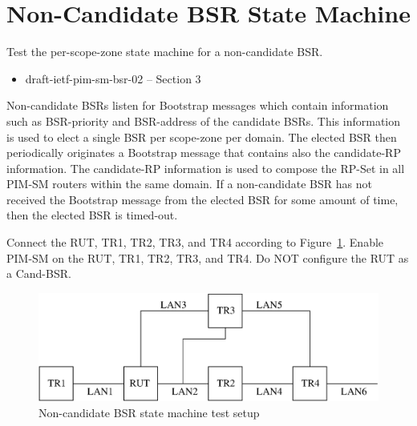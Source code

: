 \documentclass[11pt]{report}
\begin{document}
\newpage
\section{Non-Candidate BSR State Machine}

Test the per-scope-zone state machine for a non-candidate BSR.

\begin{itemize}
  \item draft-ietf-pim-sm-bsr-02 -- Section 3
\end{itemize}

Non-candidate BSRs listen for Bootstrap messages which contain information
such as BSR-priority and BSR-address of the candidate BSRs.
This information is used
to elect a single BSR per scope-zone per domain. The elected BSR then
periodically originates a Bootstrap message that contains also the
candidate-RP information. The candidate-RP information is used to compose the
RP-Set in all PIM-SM routers within the same domain. If a non-candidate BSR has
not received the Bootstrap message from the elected BSR for some amount of
time, then the elected BSR is timed-out.

Connect the RUT, TR1, TR2, TR3, and TR4 according to
Figure~\ref{fig:pim_test_6_2_non_candidate_bsr_state_machine}.
Enable PIM-SM on the RUT, TR1, TR2, TR3, and TR4. Do NOT configure the RUT as
a Cand-BSR.

\begin{figure}[htbp]
  \begin{center}
    \includegraphics[scale=0.8]{figs/pim_test_6_2_non_candidate_bsr_state_machine}
    \caption{Non-candidate BSR state machine test setup}
    \label{fig:pim_test_6_2_non_candidate_bsr_state_machine}
  \end{center}
\end{figure}


\end{document}
